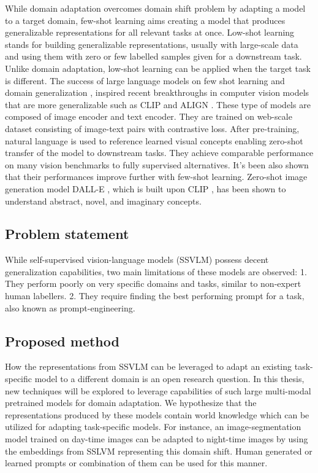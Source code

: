 \documentclass[conference]{IEEEtran}
\begin{document}
While domain adaptation overcomes domain shift problem by adapting a model to a target domain, few-shot learning aims creating a model that produces generalizable representations for all relevant tasks at once. Low-shot learning stands for building generalizable representations, usually with large-scale data and using them with zero or few labelled samples given for a downstream task. Unlike domain adaptation, low-shot learning can be applied when the target task is different. The success of large language models on few shot learning and domain generalization \cite{bert}, \cite{brown2020language} inspired recent breakthroughs in computer vision models that are more generalizable such as CLIP \cite{clip} and ALIGN \cite{align}. These type of models are composed of image encoder and text encoder. They are trained on web-scale dataset consisting of image-text pairs with contrastive loss. After pre-training, natural language is used to reference learned visual concepts enabling zero-shot transfer of the model to downstream tasks. They achieve comparable performance on many vision benchmarks to fully supervised alternatives. It's been also shown that their performances improve further with few-shot learning. Zero-shot image generation model DALL-E \cite{dalle}, which is built upon CLIP \cite{clip}, has been shown to understand abstract, novel, and imaginary concepts. 


\subsection{Problem statement}

While self-supervised vision-language models (SSVLM) possess decent generalization capabilities, two main limitations of these models are observed:
1. They perform poorly on very specific domains and tasks, similar to non-expert human labellers. 
2. They require finding the best performing prompt for a task, also known as prompt-engineering.


\subsection{Proposed method}
How the representations from SSVLM can be leveraged to adapt an existing task-specific model to a different domain is an open research question. In this thesis, new techniques will be explored to leverage capabilities of such large multi-modal pretrained models for domain adaptation. We hypothesize that the representations produced by these models contain world knowledge which can be utilized for adapting task-specific models. For instance, an image-segmentation model trained on day-time images can be adapted to night-time images by using the embeddings from SSLVM representing this domain shift. Human generated or learned prompts or combination of them can be used for this manner.
\end{document}
